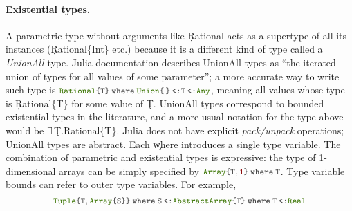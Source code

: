 \paragraph{Existential types.} A parametric type without arguments like \c{Rational}
acts as a supertype of all its instances (\c{Rational\{Int\}} etc.)
because it is a different kind of type called a \emph{UnionAll} type.  Julia
documentation describes UnionAll types as ``the iterated union of types for
all values of some parameter''; a more accurate way to write such type is
\(  \texttt{\small\color{jlbuiltin} Rational}   \texttt{\small\color{jlkeyword} \{}  \texttt{\small\color{jlbase}T}  \texttt{\small\color{jlkeyword} \}\kern0pt} \:  \texttt{\small\color{jlbase}\textbf{where}\kern0pt} \:  \texttt{\small\color{jlbuiltin} Union}\! \, \texttt{\small\color{jlkeyword} \{}  \,  \texttt{\small\color{jlkeyword} \}\kern0pt} \!\! \,\,\, \texttt{\small\color{jlkeyword} <:}\,\, \!\! \texttt{\small\color{jlbase}T} \!\! \,\,\, \texttt{\small\color{jlkeyword} <:}\,\, \!\! \texttt{\small\color{jlbuiltin} Any} \), meaning all values whose type is
\c{Rational\{T\}} for some value of \c{T}.  UnionAll types correspond
to bounded existential types in the literature, and a more usual notation
for the type above would be $\exists$\,\c{T.Rational\{T\}}. Julia does not have explicit
  \emph{pack/unpack} operations; UnionAll types are  abstract.
Each \c{where} introduces a single type variable. The combination of
parametric and existential types is expressive: the type of 1-dimensional
arrays can be simply specified by
%
\(  \texttt{\small\color{jlbuiltin} Array}   \texttt{\small\color{jlkeyword} \{}  \texttt{\small\color{jlbase}T}  \ottsym{,}   \texttt{\small\color{jlstring} 1}   \texttt{\small\color{jlkeyword} \}\kern0pt} \:  \texttt{\small\color{jlbase}\textbf{where}\kern0pt} \:  \texttt{\small\color{jlbase}T} \).  
%
Type variable bounds can refer to outer type variables. For example, 
\[  \texttt{\small\color{jlbuiltin} Tuple}\! \, \texttt{\small\color{jlkeyword} \{}  \texttt{\small\color{jlbase}T}  \ottsym{,}   \texttt{\small\color{jlbuiltin} Array}   \texttt{\small\color{jlkeyword} \{}  \texttt{\small\color{jlbase}S}  \texttt{\small\color{jlkeyword} \}\kern0pt}  \texttt{\small\color{jlkeyword} \}\kern0pt} \:  \texttt{\small\color{jlbase}\textbf{where}\kern0pt} \:  \texttt{\small\color{jlbase}S} \!\! \,\,\, \texttt{\small\color{jlkeyword} <:}\,\, \!\!  \texttt{\small\color{jlbuiltin} AbstractArray}    \texttt{\small\color{jlkeyword} \{}  \texttt{\small\color{jlbase}T}  \texttt{\small\color{jlkeyword} \}\kern0pt} \:  \texttt{\small\color{jlbase}\textbf{where}\kern0pt} \:  \texttt{\small\color{jlbase}T} \!\! \,\,\, \texttt{\small\color{jlkeyword} <:}\,\, \!\!  \texttt{\small\color{jlbuiltin} Real}  \]
